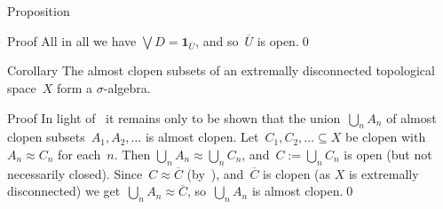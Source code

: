 \documentclass[a]{subfiles}
\begin{document}
\begin{parsec}
\begin{point}{Proposition}
\begin{point}{Proof}
All in all we have $\bigvee D = \mathbf{1}_{\overline{U}}$,
and so~$\overline{U}$ is open.\qed
\end{point}
\end{point}
\begin{point}{Corollary}%
The almost clopen subsets
of an extremally disconnected topological
space~$X$ form a $\sigma$-algebra.
\begin{point}{Proof}%
In light of~
it remains only to be shown that
the union~$\bigcup_n A_n$
of almost clopen subsets~$A_1,A_2,\dotsc$
is almost clopen.
Let~$C_1,C_2,\dotsc\subseteq X$
be clopen with $A_n\approx C_n$ for each~$n$.
Then $\bigcup_n A_n \approx \bigcup_n C_n$,
and~$C:=\bigcup_n C_n$ is open
(but not necessarily closed).
Since~$C\approx \overline{C}$
(by~),
and~$\overline{C}$ is clopen (as $X$ is extremally disconnected)
we get~$\bigcup_n A_n \approx \overline{C}$,
so~$\bigcup_n A_n$ is almost clopen.\qed
\end{point}
\end{point}
\end{parsec}
\end{document}
